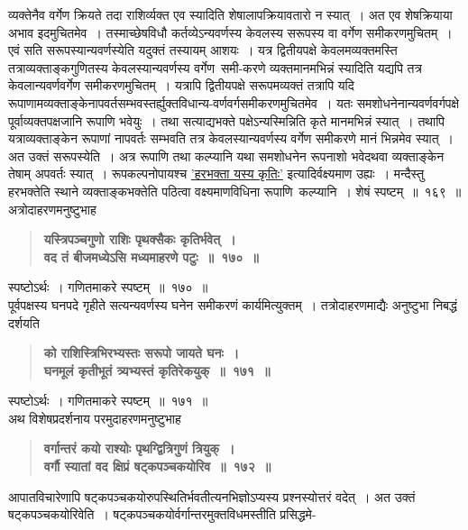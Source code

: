 \documentclass[11pt, openany]{book}
\begin{document}
\newpage

\begin{sloppypar}
\noindent व्यक्तेनैव वर्गेण क्रियते तदा राशिर्व्यक्त एव स्यादिति शेषालापक्रियावतारो न स्यात्~। अत एव शेषक्रियाया अभाव इदमुचितमेव~। तस्माच्छेषविधौ कर्तव्येऽन्यवर्णस्य केवलस्य सरूपस्य वा वर्गेण समीकरणमुचितम्~। एवं सति सरूपस्यान्यवर्णस्येति यदुक्तं तस्यायम् आशयः~। यत्र द्वितीयपक्षे केवलमव्यक्तमस्ति तत्राव्यक्ताङ्कगुणितस्य केवलस्यान्यवर्णस्य वर्गेण~समी-करणे व्यक्तमानमभिन्नं स्यादिति यद्यपि तत्र केवलान्यवर्णवर्गेण समीकरणमुचितम्~। यत्रापि द्वितीयपक्षे सरूपमव्यक्तं तत्रापि यदि रूपाणामव्यक्ताङ्केनापवर्तसम्भवस्तर्ह्युक्तविधान्य-वर्णवर्गसमीकरणमुचितमेव~। यतः समशोधनेनान्यवर्णवर्गपक्षे पूर्वाव्यक्तपक्षजानि रूपाणि भवेयुः~। तथा सत्याद्यभक्ते पक्षेऽन्यस्मिन्निति कृते मानमभिन्नं स्यात्~। तथापि यत्राव्यक्ताङ्केन रूपाणां नापवर्तः सम्भवति तत्र केवलस्यान्यवर्णस्य वर्गेण समीकरणे मानं भिन्नमेव स्यात्~। अत उक्तं सरूपस्येति~। अत्र रूपाणि तथा कल्प्यानि यथा समशोधनेन रूपनाशो भवेदथवा व्यक्ताङ्केन तेषाम् अपवर्तः स्यात्~। रूपकल्पनोपायश्च \hyperref[10.178]{'हरभक्ता यस्य कृतिः'} इत्यादिर्वक्ष्यमाण उह्यः~। मन्दैस्तु हरभक्तेति स्थाने व्यक्ताङ्कभक्तेति पठित्वा वक्ष्यमाणविधिना रूपाणि~कल्प्यानि~। शेषं स्पष्टम्~॥~१६९~॥\\

{\small अत्रोदाहरणमनुष्टुभाह\textendash }

 \label{10.170}
\begin{quote}
{\large \textbf{{\color{purple}यस्त्रिपञ्चगुणो राशिः पृथक्सैकः कृतिर्भवेत्~।\\
वद तं बीजमध्येऽसि मध्यमाहरणे पटुः~॥~१७०~॥}}}
\end{quote}

स्पष्टोऽर्थः~। गणितमाकरे स्पष्टम्~॥~१७०~॥\\

{\small पूर्वपक्षस्य घनपदे गृहीते सत्यन्यवर्णस्य घनेन समीकरणं कार्यमित्युक्तम्~। तत्रोदाहरणमाद्यैः अनुष्टुभा निबद्धं दर्शयति\textendash }

 \label{10.171}
\begin{quote}
{\large \textbf{{\color{purple}को राशिस्त्रिभिरभ्यस्तः सरूपो जायते घनः~।\\
घनमूलं कृतीभूतं त्र्यभ्यस्तं कृतिरेकयुक्~॥~१७१~॥}}}
\end{quote}

स्पष्टोऽर्थः~। गणितमाकरे स्पष्टम्~॥~१७१~॥\\

{\small अथ विशेषप्रदर्शनाय परमुदाहरणमनुष्टुभाह\textendash }

 \label{10.172}
\begin{quote}
{\large \textbf{{\color{purple}वर्गान्तरं कयो राश्योः पृथग्द्वित्रिगुणं त्रियुक्~।\\
वर्गौ स्यातां वद क्षिप्रं षट्कपञ्चकयोरिव~॥~१७२~॥}}}
\end{quote}

आपातविचारेणापि षट्कपञ्चकयोरुपस्थितिर्भवतीत्यनभिज्ञोऽप्यस्य प्रश्नस्योत्तरं वदेत्~। अत उक्तं षट्कपञ्चकयोरिवेति~। षट्कपञ्चकयोर्वर्गान्तरमुक्तविधमस्तीति प्रसिद्धमे-
\end{sloppypar}
\end{document}
